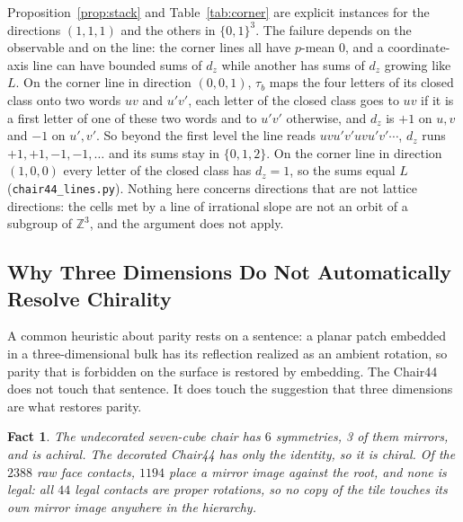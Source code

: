 \documentclass[11pt]{article}
\newtheorem{fact}{Fact}
\theoremstyle{definition}
\theoremstyle{remark}
\newcommand{\code}[1]{\texttt{#1}}
\begin{document}
\noindent
Proposition~\ref{prop:stack} and Table~\ref{tab:corner} are explicit instances for the directions $(1,1,1)$ and the others in
$\{0,1\}^{3}$.  The failure depends on the observable and on the line: the corner lines all have $p$-mean $0$, and a
coordinate-axis line can have bounded sums of $d_{z}$ while another has sums of $d_{z}$ growing like $L$.  On the corner line
in direction $(0,0,1)$, $\tau_{b}$ maps the four letters of its closed class onto two words $uv$ and $u'v'$, each letter of
the closed class goes to $uv$ if it is a first letter of one of these two words and to $u'v'$ otherwise, and $d_{z}$ is $+1$ on $u,v$ and $-1$ on $u',v'$.
So beyond the first level the line reads $uvu'v'uvu'v'\cdots$, $d_{z}$ runs $+1,+1,-1,-1,\dots$ and its sums stay in
$\{0,1,2\}$.  On the corner line in direction $(1,0,0)$ every letter of the closed class has $d_{z}=1$, so the sums equal $L$
(\code{chair44\_lines.py}).  Nothing here
concerns directions that are not lattice directions: the cells met by a line of irrational slope are not an orbit of a
subgroup of $\mathbb{Z}^{3}$, and the argument does not apply.
\subsection{Why Three Dimensions Do Not Automatically Resolve Chirality}

A common heuristic about parity rests on a sentence: a planar
patch embedded in a three-dimensional bulk has its reflection realized as an ambient rotation, so parity that is
forbidden on the surface is restored by embedding.  The Chair44 does not touch that sentence.
It does touch the suggestion that three dimensions are what restores parity.

\begin{fact}
\label{fact:chairchiral}
The undecorated seven-cube chair has $6$ symmetries, 3 of them mirrors, and is achiral.
The decorated Chair44 has only the identity, so it is chiral.  Of the $2388$ raw face
contacts, $1194$ place a mirror image against the root, and none is legal: all $44$
legal contacts are proper rotations, so no copy of the tile touches its own mirror image
anywhere in the hierarchy.
\end{fact}
\end{document}
